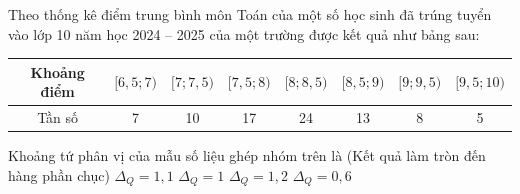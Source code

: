 \begin{ex}%
Theo thống kê điểm trung bình môn Toán của một số học sinh đã trúng tuyển vào lớp 10 năm học 2024 – 2025 của một trường được kết quả như bảng sau:
\begin{center}
\begin{tabular}{|c|c|c|c|c|c|c|c|}
    \hline
    Khoảng điểm & $[6,5; 7)$ & $[7; 7,5)$ & $[7,5; 8)$ & $[8; 8,5)$ & $[8,5; 9)$ & $[9; 9,5)$ & $[9,5; 10)$ \\
    \hline
    Tần số & 7 & 10 & 17 & 24 & 13 & 8 & 5 \\
    \hline
\end{tabular}
\end{center}

Khoảng tứ phân vị của mẫu số liệu ghép nhóm trên là (Kết quả làm tròn đến hàng phần chục)
\choice
{\True $\Delta_Q=1,1$}
{$\Delta_Q=1$}
{$\Delta_Q=1,2$}
{$\Delta_Q=0,6$}
\end{ex}

